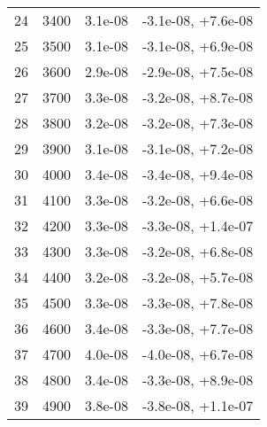 \begin{table}
\begin{adjustbox}{width=1\textwidth/2}
\begin{tabular}{|c|c|c|c|}
\cline{1-4}
24 & 3400 & 3.1e-08 & -3.1e-08, +7.6e-08 \\
\cline{1-4}
25 & 3500 & 3.1e-08 & -3.1e-08, +6.9e-08 \\
\cline{1-4}
26 & 3600 & 2.9e-08 & -2.9e-08, +7.5e-08 \\
\cline{1-4}
27 & 3700 & 3.3e-08 & -3.2e-08, +8.7e-08 \\
\cline{1-4}
28 & 3800 & 3.2e-08 & -3.2e-08, +7.3e-08 \\
\cline{1-4}
29 & 3900 & 3.1e-08 & -3.1e-08, +7.2e-08 \\
\cline{1-4}
30 & 4000 & 3.4e-08 & -3.4e-08, +9.4e-08 \\
\cline{1-4}
31 & 4100 & 3.3e-08 & -3.2e-08, +6.6e-08 \\
\cline{1-4}
32 & 4200 & 3.3e-08 & -3.3e-08, +1.4e-07 \\
\cline{1-4}
33 & 4300 & 3.3e-08 & -3.2e-08, +6.8e-08 \\
\cline{1-4}
34 & 4400 & 3.2e-08 & -3.2e-08, +5.7e-08 \\
\cline{1-4}
35 & 4500 & 3.3e-08 & -3.3e-08, +7.8e-08 \\
\cline{1-4}
36 & 4600 & 3.4e-08 & -3.3e-08, +7.7e-08 \\
\cline{1-4}
37 & 4700 & 4.0e-08 & -4.0e-08, +6.7e-08 \\
\cline{1-4}
38 & 4800 & 3.4e-08 & -3.3e-08, +8.9e-08 \\
\cline{1-4}
39 & 4900 & 3.8e-08 & -3.8e-08, +1.1e-07 \\
\cline{1-4}
\end{tabular}
\end{adjustbox}
\end{table}

